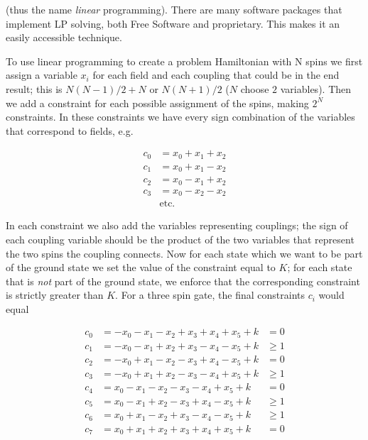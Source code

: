 (thus the name \emph{linear} programming).  There are many software packages that implement LP solving, both Free Software and proprietary.  This makes it an easily accessible technique.

To use linear programming to create a problem Hamiltonian with N spins we first assign a variable $x_i$ for each field and each coupling that could be in the end result; this is $N(N-1)/2 + N$ or $N(N + 1)/2$ ($N$ choose $2$ variables).  Then we add a constraint for each possible assignment of the spins, making $2^N$ constraints.  In these constraints we have every sign combination of the variables that correspond to fields, e.g.

\begin{align}
	 c_0 &  = x_0 + x_1 + x_2 \nonumber \\ 
	 c_1 & = x_0 + x_1 - x_2 \nonumber \\ 
	 c_2 & = x_0 - x_1 + x_2 \nonumber \\
	 c_3 & = x_0 - x_2 - x_2 \\
		 & \mathrm{etc.} \nonumber
\end{align}

In each constraint we also add the variables representing couplings; the sign of each coupling variable should be the product of the two variables that represent the two spins the coupling connects.  Now for each state which we want to be part of the ground state we set the value of the constraint equal to $K$; for each state that is \emph{not} part of the ground state, we enforce that the corresponding constraint is strictly greater than $K$.  For a three spin gate, the final constraints $c_i$ would equal

\begin{align}
	c_0 &= -x_0 - x_1 - x_2 + x_3 + x_4 + x_5 + k &= 0 \nonumber\\
	c_1 &= -x_0 - x_1 + x_2 + x_3 - x_4 - x_5 + k &\ge 1 \nonumber\\
	c_2 &= -x_0 + x_1 - x_2 - x_3 + x_4 - x_5 + k &= 0 \nonumber\\
	c_3 &= -x_0 + x_1 + x_2 - x_3 - x_4 + x_5 + k &\ge 1 \nonumber\\
	c_4 &= x_0 - x_1 - x_2 - x_3 - x_4 + x_5 + k &= 0 \nonumber\\
	c_5 &= x_0 - x_1 + x_2 - x_3 + x_4 - x_5 + k &\ge 1 \nonumber\\
	c_6 &= x_0 + x_1 - x_2 + x_3 - x_4 - x_5 + k &\ge 1 \nonumber\\
	c_7 &= x_0 + x_1 + x_2 + x_3 + x_4 + x_5 + k &= 0 
\end{align}

